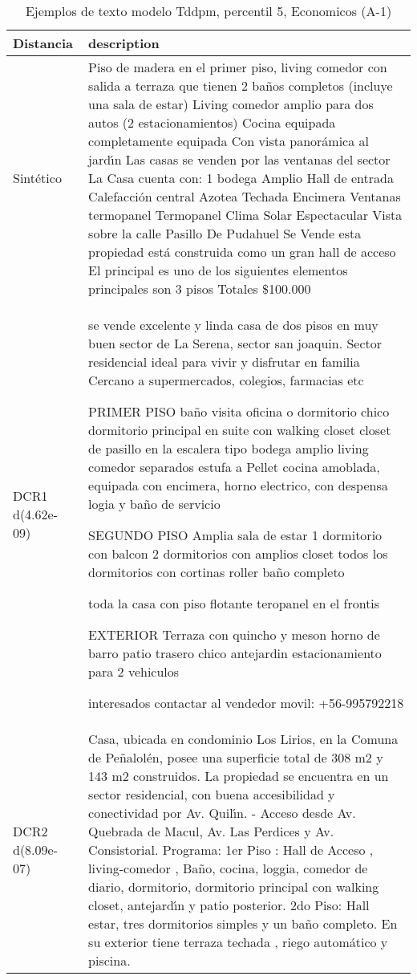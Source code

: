\begin{table}[H]
\centering
\fontsize{10}{14}\selectfont
\caption{Ejemplos de texto modelo Tddpm, percentil 5, Economicos (A-1)}
\label{table-example-economicos-a-1-tddpm_mlp-5p-text}
\begin{tabular}{|l|m{35em}|}
\hline
\rowcolor[gray]{0.8}
Distancia & description \\
\hline Sintético & Piso de madera en el primer piso, living comedor con salida a terraza que tienen 2 ba\~nos completos (incluye una sala de estar) Living comedor amplio para dos autos (2 estacionamientos) Cocina equipada completamente equipada Con vista panor\'amica al jard{\'\i}n Las casas se venden por las ventanas del sector La Casa cuenta con: 1 bodega Amplio Hall de entrada Calefacci\'on central Azotea Techada Encimera Ventanas termopanel Termopanel Clima Solar Espectacular Vista sobre la calle Pasillo De Pudahuel Se Vende esta propiedad est\'a construida como un gran hall de acceso El principal es uno de los siguientes elementos principales son 3 pisos Totales \$100.000 \\
\hline DCR1 d(4.62e-09) & se vende excelente y linda casa de dos pisos
en muy buen sector de La Serena, sector san joaquin.
Sector residencial ideal para vivir y disfrutar en familia
Cercano a supermercados, colegios, farmacias etc

PRIMER PISO
ba\~no visita
oficina o dormitorio chico
dormitorio principal en suite con walking closet
closet de pasillo en la escalera tipo bodega
amplio living comedor separados
estufa a Pellet
cocina amoblada, equipada con encimera, horno electrico, con despensa 
logia y ba\~no de servicio

SEGUNDO PISO
Amplia sala de estar
1 dormitorio con balcon
2 dormitorios con amplios closet
todos los dormitorios con cortinas roller
ba\~no completo

toda la casa con piso flotante
teropanel en el frontis


EXTERIOR
Terraza con quincho y meson
horno de barro
patio trasero chico
antejardin
estacionamiento para 2 vehiculos

interesados contactar al vendedor
movil: +56-995792218 \\
\hline DCR2 d(8.09e-07) & Casa, ubicada en condominio Los Lirios, en la Comuna de Pe\~nalol\'en, posee una superficie total de 308 m2 y 143 m2 construidos.  La propiedad se encuentra en un sector residencial, con buena accesibilidad y conectividad por Av. Quil{\'\i}n.  - Acceso desde Av. Quebrada de Macul, Av. Las Perdices y Av. Consistorial.  Programa: 1er Piso : Hall de Acceso , living-comedor , Ba\~no, cocina, loggia, comedor de diario, dormitorio, dormitorio principal con walking closet, antejard{\'\i}n y patio posterior. 2do Piso: Hall estar, tres dormitorios simples y un ba\~no completo.  En su exterior tiene terraza techada , riego autom\'atico y piscina. \\
\hline
\end{tabular}
\end{table}
